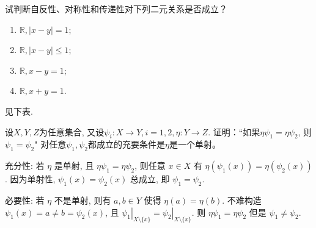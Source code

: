 \begin{problem}
    试判断自反性、对称性和传递性对下列二元关系是否成立？
    \begin{enumerate}[label=(\roman*)]
        \item  $\mathbb{ R}, |x - y| = 1 $;
        \item $\mathbb{ R}, |x - y| \leq 1 $;
        \item $\mathbb{ R}, x - y = 1 $;
        \item $\mathbb{ R}, x + y = 1 $. 
    \end{enumerate}
\end{problem}

\begin{solution}
    见下表.
    \begin{table}[htbp]
        \caption{问题~}
    \end{table}
\end{solution}

\setcounter{pb}{11}

\begin{problem}
    设$X, Y, Z$为任意集合, 又设$\psi_i:X\to Y,i=1,2,\eta:Y\to Z$. 证明：“如果$\eta\psi_1=\eta\psi_2$, 
    则$\psi_1=\psi_2$" 对任意$\psi_1,\psi_2$都成立的充要条件是$\eta$是一个单射。
\end{problem}

\begin{solution}
    充分性: 若 $\eta$ 是单射, 且 $\eta\psi_{1}=\eta\psi_{2}$, 则任意 $x\in X$ 有 $\eta(\psi_{1}(x))=\eta(\psi_{2}(x))$. 
    因为单射性, $\psi_{1}(x)=\psi_{2}(x)$ 总成立, 即 $\psi_{1}=\psi_{2}$. 
    \par 必要性: 若 $\eta$ 不是单射, 则有 $a,b\in Y$ 使得 $\eta(a)=\eta(b)$. 
    不难构造 $\psi_{1}(x)=a\ne b=\psi_{2}(x)$, 且 $\left.{\psi_{1}}\right|_{X\setminus\{x\}}^{}=\left.{\psi_{2}}\right|_{X\setminus\{x\}}^{}$. 
    则 $\eta\psi_{1}=\eta\psi_{2}$ 但是 $\psi_{1}\ne\psi_{2}$.
\end{solution}


